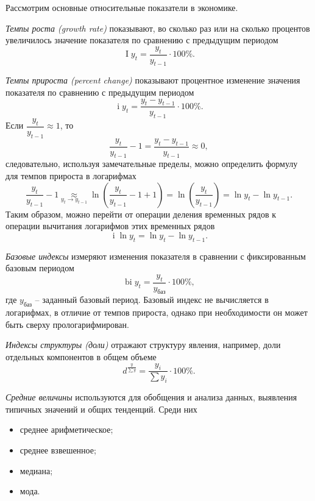 \documentclass[a4paper, 14pt]{extreport}
\numberwithin{equation}{section}
\newcommand{\I}{\mathbb{I}}
\renewcommand{\I}{\operatorname{I}}
\renewcommand{\i}{\operatorname{i}}
\newcommand{\bi}{\operatorname{bi}}
\numberwithin{equation}{section}
\begin{document}
	Рассмотрим основные относительные показатели в экономике.
	
	\textit{Темпы роста (growth rate)} показывают, во сколько раз или на сколько процентов увеличилось значение показателя по сравнению с предыдущим периодом
	\begin{equation}\label{eq:gr}
		\I y_t = \dfrac{y_t}{y_{t-1}}\cdot 100\%.
	\end{equation}
	
	\textit{Темпы прироста (percent change)} показывают процентное изменение значения показателя по сравнению с предыдущим периодом
	\begin{equation}\label{eq:pc}
		\i y_t = \dfrac{y_t - y_{t-1}}{y_{t-1}}\cdot 100\%.
	\end{equation}
	Если $\dfrac{y_t}{y_{t-1}} \approx 1$, то 
	\begin{equation*}
		\dfrac{y_t}{y_{t-1}} - 1 = \dfrac{y_t - y_{t-1}}{y_{t-1}} \approx 0,
	\end{equation*}
	следовательно, используя замечательные пределы, можно определить формулу для темпов прироста в логарифмах
	\begin{equation*}
		\dfrac{y_t}{y_{t-1}} - 1\underset{y_t \to y_{t-1}}\approx\ln \left(\dfrac{y_t}{y_{t-1}} - 1 + 1 \right) = \ln\left(\dfrac{y_t}{y_{t-1}}\right) = \ln y_t - \ln y_{t-1}.
	\end{equation*}
	Таким образом, можно перейти от операции деления временных рядов к операции вычитания логарифмов этих временных рядов
	\begin{equation}\label{eq:log-pc}
		\i\ln y_t = \ln y_t - \ln y_{t-1}.
	\end{equation}
	
	\textit{Базовые индексы} измеряют изменения показателя в сравнении с фиксированным базовым периодом
	\begin{equation}
		\bi y_t = \dfrac{y_t}{y_\text{баз}}\cdot 100\%,
	\end{equation}
	где $y_\text{баз}$ -- заданный базовый период. Базовый индекс не вычисляется в логарифмах, в отличие от темпов прироста, однако при необходимости он может быть сверху прологарифмирован.
	
	\textit{Индексы структуры (доли)} отражают структуру явления, например, доли отдельных компонентов в общем объеме
	\begin{equation}
		d^{\frac{y}{\sum y}} = \dfrac{y_i}{\sum y_i}\cdot 100\%.
	\end{equation}
	
	\textit{Средние величины} используются для обобщения и анализа данных, выявления типичных значений и общих тенденций. Среди них
	\begin{itemize}
		\item среднее арифметическое;
		\item среднее взвешенное;
		\item медиана;
		\item мода.
	\end{itemize}
	
\end{document}
